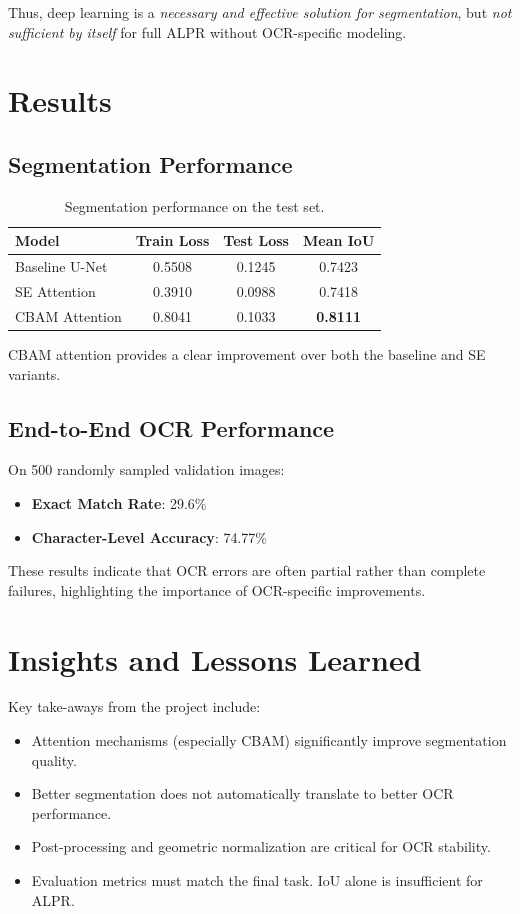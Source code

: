 \documentclass[11pt,a4paper]{article}
\begin{document}
Thus, deep learning is a \emph{necessary and effective solution for segmentation}, but \emph{not sufficient by itself} for full ALPR without OCR-specific modeling.

\section{Results}

\subsection{Segmentation Performance}

\begin{table}[h]
\centering
\caption{Segmentation performance on the test set.}
\begin{tabular}{lccc}
\toprule
Model & Train Loss & Test Loss & Mean IoU \\
\midrule
Baseline U-Net & 0.5508 & 0.1245 & 0.7423 \\
SE Attention & 0.3910 & 0.0988 & 0.7418 \\
CBAM Attention & 0.8041 & 0.1033 & \textbf{0.8111} \\
\bottomrule
\end{tabular}
\end{table}

CBAM attention provides a clear improvement over both the baseline and SE variants.

\subsection{End-to-End OCR Performance}

On 500 randomly sampled validation images:
\begin{itemize}
    \item \textbf{Exact Match Rate}: 29.6\%
    \item \textbf{Character-Level Accuracy}: 74.77\%
\end{itemize}

These results indicate that OCR errors are often partial rather than complete failures, highlighting the importance of OCR-specific improvements.

\section{Insights and Lessons Learned}

Key take-aways from the project include:
\begin{itemize}
    \item Attention mechanisms (especially CBAM) significantly improve segmentation quality.
    \item Better segmentation does not automatically translate to better OCR performance.
    \item Post-processing and geometric normalization are critical for OCR stability.
    \item Evaluation metrics must match the final task. IoU alone is insufficient for ALPR.
\end{itemize}
\end{document}
